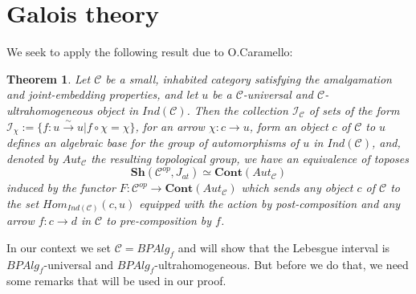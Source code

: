 \documentclass[a4paper]{amsproc}
\theoremstyle{plain}
\newtheorem{theorem}{Theorem}[section]
\theoremstyle{definition}
\theoremstyle{remark}
\numberwithin{equation}{section}
\begin{document}
\section{Galois theory}

We seek to apply the following result due to O.Caramello:

\begin{theorem}\label{olivia}
Let $\mathcal{C}$ be a small, inhabited category satisfying the amalgamation and joint-embedding properties, and let $u$ be a $\mathcal{C}$-universal and $\mathcal{C}$-ultrahomogeneous object in $Ind(\mathcal{C})$. Then the collection $\mathcal{I}_{\mathcal{C}}$ of sets of the form $\mathcal{I}_{\chi}:=\{f:u\overset{\sim}{\rightarrow} u| f\circ \chi=\chi\} $, for an arrow $\chi:c\rightarrow u$, form an object $c$ of $\mathcal{C}$ to $u$ defines an algebraic base for the group of automorphisms of $u$ in $Ind(\mathcal{C})$, and, denoted by $Aut_\mathcal{C}$ the resulting topological group, we have an equivalence of toposes
\[\textbf{Sh}(\mathcal{C}^{op},J_{at})\simeq \textbf{Cont}(Aut_\mathcal{C}) \]
induced by the functor $F:\mathcal{C}^{op}\rightarrow \textbf{Cont}(Aut_{\mathcal{C}})$ which sends any object $c$ of $\mathcal{C}$ to the set $Hom_{Ind(\mathcal{C})}(c,u)$ equipped with the action by post-composition and any arrow $f:c\rightarrow d$ in $\mathcal{C}$ to pre-composition by $f$.
\end{theorem}

In our context we set $\mathcal{C}=BPAlg_f$ and will show that the Lebesgue interval is $BPAlg_f$-universal and $BPAlg_f$-ultrahomogeneous. But before we do that, we need some remarks that will be used in our proof.
\end{document}
